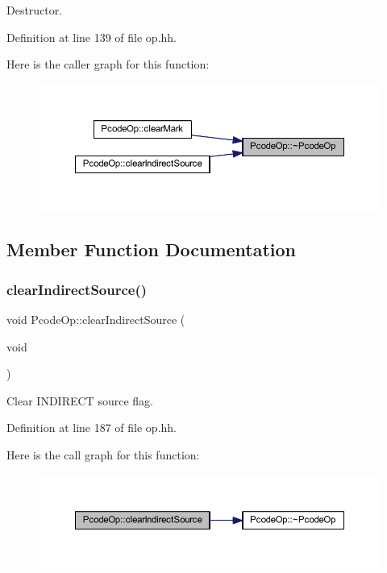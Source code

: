 Destructor. 



Definition at line 139 of file op.\+hh.

Here is the caller graph for this function\+:
\nopagebreak
\begin{figure}[H]
\begin{center}
\leavevmode
\includegraphics[width=350pt]{class_pcode_op_a9c4e5b2b819c19196421903f27e7fbe8_icgraph}
\end{center}
\end{figure}


\subsection{Member Function Documentation}
\mbox{\label{class_pcode_op_a6525e43210caa2bb68bb6e3a5bb5037c}} 
\subsubsection{\texorpdfstring{clearIndirectSource()}{clearIndirectSource()}}
{\footnotesize\ttfamily void Pcode\+Op\+::clear\+Indirect\+Source (\begin{DoxyParamCaption}\item[{void}]{ }\end{DoxyParamCaption})\hspace{0.3cm}{\ttfamily [inline]}}



Clear I\+N\+D\+I\+R\+E\+CT source flag. 



Definition at line 187 of file op.\+hh.

Here is the call graph for this function\+:
\nopagebreak
\begin{figure}[H]
\begin{center}
\leavevmode
\includegraphics[width=350pt]{class_pcode_op_a6525e43210caa2bb68bb6e3a5bb5037c_cgraph}
\end{center}
\end{figure}
\mbox{\label{class_pcode_op_af901dbb8a9dc99db2abab8d3c8ccde2e}} 
